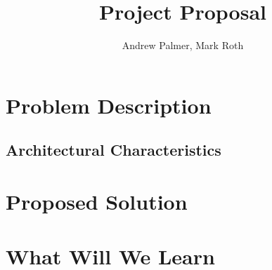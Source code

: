 \documentclass[12pt]{article}
\title{Project Proposal}
\author{Andrew Palmer, Mark Roth}
\begin{document}
    \maketitle

    \section{Problem Description}

    \subsection{Architectural Characteristics}

    \section{Proposed Solution}

    \section{What Will We Learn}
\end{document}
